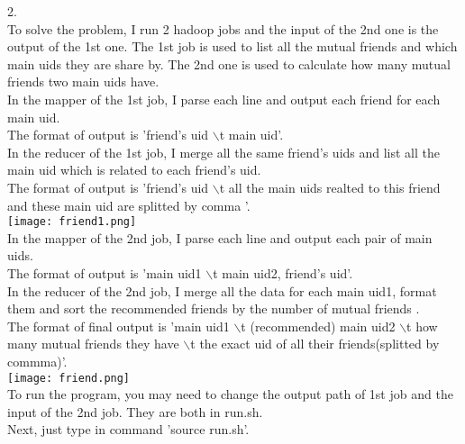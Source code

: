 \documentclass[a4paper]{article}
\begin{document}
2. \\
To solve the problem, I run 2 hadoop jobs and the input of the 2nd one is the output of the 1st one. The 1st job is used to list all the mutual friends and which main uids they are share by. The 2nd one is used to calculate how many mutual friends two main uids have.\\
In the mapper of the 1st job, I parse each line and output each friend for each main uid.\\
The format of output is 'friend's uid $\backslash$t main uid'.\\
In the reducer of the 1st job, I merge all the same friend's uids and list all the main uid which is related to each friend's uid.\\
The format of output is 'friend's uid $\backslash$t all the main uids realted to this friend and these main uid are splitted by comma '.\\
\texttt{[image: friend1.png]}\\
In the mapper of the 2nd job,  I parse each line and output each pair of main uids.\\
The format of output is 'main uid1 $\backslash$t main uid2, friend's uid'.\\
In the reducer of the 2nd job, I merge all the data for each main uid1, format them and sort the recommended friends by the number of mutual friends .\\
The format of final output is 'main uid1 $\backslash$t (recommended) main uid2 $\backslash$t how many mutual friends they have $\backslash$t the exact uid of all their friends(splitted by commma)'.\\
\texttt{[image: friend.png]}\\
To run the program, you may need to change the output path of 1st job and the input of the 2nd job. They are both in run.sh.\\
Next, just type in command 'source run.sh'.\\
\end{document}
